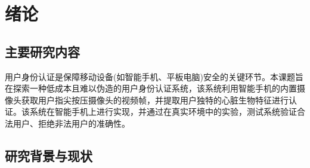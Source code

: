 %
%
%
%
%
%

\chapter{绪论}

\section{主要研究内容}

	{用户身份认证是保障移动设备(如智能手机、平板电脑)安全的关键环节。本课题旨在探索一种低成本且难以伪造的用户身份认证系统，该系统利用智能手机的内置摄像头获取用户指尖按压摄像头的视频帧，并提取用户独特的心脏生物特征进行认证。该系统在智能手机上进行实现，并通过在真实环境中的实验，测试系统验证合法用户、拒绝非法用户的准确性。}

\section{研究背景与现状}
